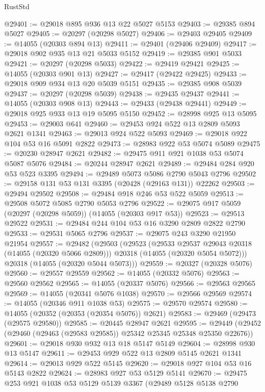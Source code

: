 \begin{lexlean}{RustStd}
\begin{coremodule}
@29401 := @29018 @895 @936 @13 @22 @5027 @5153
@29403 := @29385 @894 @5027
@29405 := @20297 (@20298 @5027)
@29406 := @29403 @29405
@29409 := @14055 (@20303 @894 @13)
@29411 := @29401 (@29406 @29409)
@29417 := @29018 @902 @935 @13 @21 @5033 @5152
@29419 := @29385 @901 @5033
@29421 := @20297 (@20298 @5033)
@29422 := @29419 @29421
@29425 := @14055 (@20303 @901 @13)
@29427 := @29417 (@29422 @29425)
@29433 := @29018 @909 @934 @13 @20 @5039 @5151
@29435 := @29385 @908 @5039
@29437 := @20297 (@20298 @5039)
@29438 := @29435 @29437
@29441 := @14055 (@20303 @908 @13)
@29443 := @29433 (@29438 @29441)
@29449 := @29018 @925 @933 @13 @19 @5095 @5150
@29452 := @28998 @925 @13 @5095
@29453 := @29003 @641
@29460 := @29453 @924 @522 @13 @2809 @5093 @2621 @1341
@29463 := @29013 @924 @522 @5093
@29469 := @29018 @922 @104 @53 @16 @5091 @2822
@29473 := @28983 @922 @53 @5074 @5089
@29475 := @20230 @28947 @2621
@29482 := @29475 @911 @921 @1038 @53 @5074 @5087 @5076
@29484 := @20244 @28947 @2621
@29489 := @29484 @284 @920 @53 @523 @3395
@29494 := @29489 @5073 @5086 @2790 @5043 @2796
@29502 := @29158 @131 @53 @131 @3395 (@20428 (@29163 @131)) @22262
@29503 := @29494 @29502
@29508 := @29484 @918 @246 @53 @522 @5059
@29513 := @29508 @5072 @5085 @2790 @5053 @2796
@29522 := @29075 @917 @5059 (@20297 (@20298 @5059)) (@14055 (@20303 @917 @53))
@29523 := @29513 @29522
@29531 := @29484 @244 @104 @53 @16 @3290 @2809 @2822 @2790
@29533 := @29531 @5065 @2796
@29537 := @29075 @243 @3290 @21950 @21954
@29557 := @29482
    (@29503
      (@29523
        (@29533 @29537 @29043 @20318 (@14055 (@20320 @5066 @2809)))
        @20318
        (@14055 (@20320 @5054 @5072)))
      @20318
      (@14055 (@20320 @5044 @5073)))
@29559 := @20327 (@20328 @5076)
@29560 := @29557 @29559
@29562 := @14055 (@20332 @5076)
@29563 := @29560 @29562
@29565 := @14055 (@20337 @5076)
@29566 := @29563 @29565
@29569 := @14055 (@20341 @5076 @1038)
@29570 := @29566 @29569
@29574 := @14055 (@20346 @911 @1038 @53)
@29575 := @29570 @29574
@29580 := @14055 (@20352 (@20353 (@20354 @5076)) @2621)
@29583 := @29469 (@29473 (@29575 @29580))
@29585 := @20445 @28947 @2621
@29595 := @29449 (@29452 (@29460 (@29463 (@29583 @29585)) @25342 @25345 @25348 @25350 @22676))
@29601 := @29018 @930 @932 @13 @18 @5147 @5149
@29604 := @28998 @930 @13 @5147
@29611 := @29453 @929 @522 @13 @2809 @5145 @2621 @1341
@29614 := @29013 @929 @522 @5145
@29620 := @29018 @927 @104 @53 @16 @5143 @2822
@29624 := @28983 @927 @53 @5129 @5141
@29670 := @29475
    @253
    @921
    @1038
    @53
    @5129
    @5139
    @3367
    (@29489
      @5128
      @5138
      @2790

\end{coremodule}
\end{lexlean}
